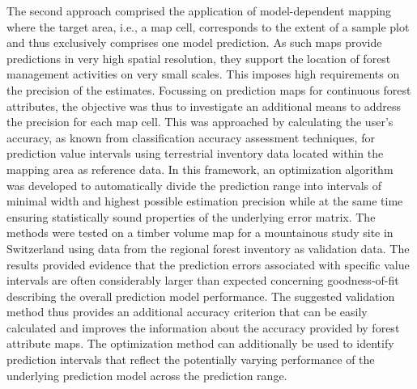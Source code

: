 The second approach comprised the application of model-dependent mapping where the target area, i.e., a map cell, corresponds to the extent of a sample plot and thus exclusively comprises one model prediction. As such maps provide predictions in very high spatial resolution, they support the location of forest management activities on very small scales. This imposes high requirements on the precision of the estimates. Focussing on prediction maps for continuous forest attributes, the objective was thus to investigate an additional means to address the precision for each map cell. This was approached by calculating the user's accuracy, as known from classification accuracy assessment techniques, for prediction value intervals using terrestrial inventory data located within the mapping area as reference data. In this framework, an optimization algorithm was developed to automatically divide the prediction range into intervals of minimal width and highest possible estimation precision while at the same time ensuring statistically sound properties of the underlying error matrix. The methods were tested on a timber volume map for a mountainous study site in Switzerland using data from the regional forest inventory as validation data. The results provided evidence that the prediction errors associated with specific value intervals are often considerably larger than expected concerning goodness-of-fit describing the overall prediction model performance. The suggested validation method thus provides an additional accuracy criterion that can be easily calculated and improves the information about the accuracy provided by forest attribute maps. The optimization method can additionally be used to identify prediction intervals that reflect the potentially varying performance of the underlying prediction model across the prediction range.